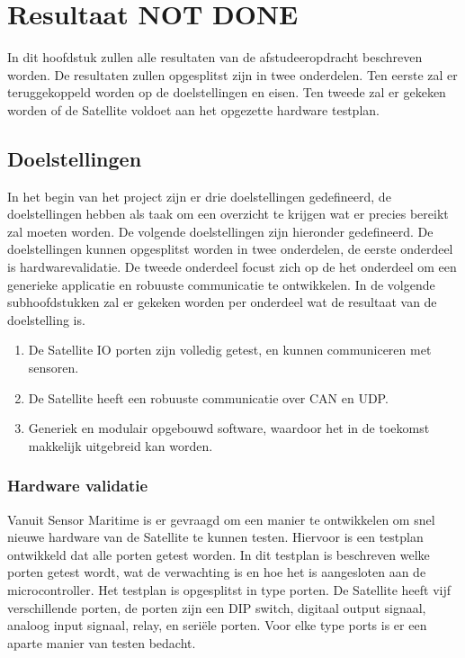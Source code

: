 \chapter{Resultaat NOT DONE}
In dit hoofdstuk zullen alle resultaten van de afstudeeropdracht beschreven worden. De resultaten zullen opgesplitst zijn in twee onderdelen. Ten eerste zal er teruggekoppeld worden op de doelstellingen en eisen. Ten tweede zal er gekeken worden of de Satellite voldoet aan het opgezette hardware testplan.

\section{Doelstellingen}
In het begin van het project zijn er drie doelstellingen gedefineerd, de doelstellingen hebben als taak om een overzicht te krijgen wat er precies bereikt zal moeten worden. De volgende doelstellingen zijn hieronder gedefineerd. De doelstellingen kunnen opgesplitst worden in twee onderdelen, de eerste onderdeel is hardwarevalidatie. De tweede onderdeel focust zich op de het onderdeel om een generieke applicatie en robuuste communicatie te ontwikkelen. In de volgende subhoofdstukken zal er gekeken worden per onderdeel wat de resultaat van de doelstelling is.
\begin{enumerate}
	\item De Satellite IO porten zijn volledig getest, en kunnen communiceren met sensoren.
	\item De Satellite heeft een robuuste communicatie over CAN en UDP.
	\item Generiek en modulair opgebouwd software, waardoor het in de toekomst makkelijk uitgebreid kan worden.
\end{enumerate}

\subsection{Hardware validatie}
Vanuit Sensor Maritime is er gevraagd om een manier te ontwikkelen om snel nieuwe hardware van de Satellite te kunnen testen. Hiervoor is een testplan ontwikkeld dat alle porten getest worden. In dit testplan is beschreven welke porten getest wordt, wat de verwachting is en hoe het is aangesloten aan de microcontroller. Het testplan is opgesplitst in type porten. De Satellite heeft vijf verschillende porten, de porten zijn een DIP switch, digitaal output signaal, analoog input signaal, relay, en seriële porten. Voor elke type ports is er een aparte manier van testen bedacht. \newline

